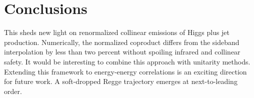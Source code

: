 \section{Conclusions}\label{sec:conclusions}

This sheds new light on renormalized collinear emissions of Higgs plus
jet production. Numerically, the normalized coproduct differs from the
sideband interpolation by less than two percent without spoiling
infrared and collinear safety. It would be interesting to combine this
approach with unitarity methods. Extending this framework to
energy-energy correlations is an exciting direction for future work. A
soft-dropped Regge trajectory emerges at next-to-leading order.

